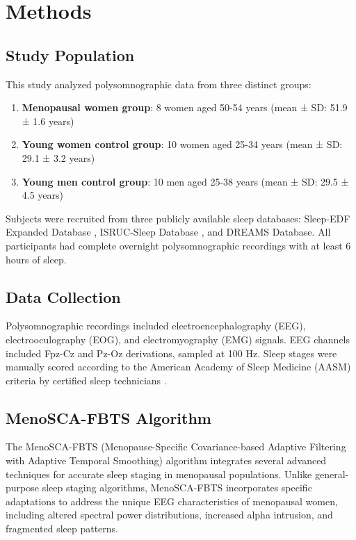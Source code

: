 \documentclass[a4paper,fleqn]{cas-dc}
\begin{document}
\section{Methods}\label{sec2}

\subsection{Study Population}

This study analyzed polysomnographic data from three distinct groups:

\begin{enumerate}
\item \textbf{Menopausal women group}: 8 women aged 50-54 years (mean ± SD: 51.9 ± 1.6 years)
\item \textbf{Young women control group}: 10 women aged 25-34 years (mean ± SD: 29.1 ± 3.2 years)
\item \textbf{Young men control group}: 10 men aged 25-38 years (mean ± SD: 29.5 ± 4.5 years)
\end{enumerate}

Subjects were recruited from three publicly available sleep databases: Sleep-EDF Expanded Database \cite{Goldberger2000}, ISRUC-Sleep Database \cite{Khalighi2016}, and DREAMS Database. All participants had complete overnight polysomnographic recordings with at least 6 hours of sleep.

\subsection{Data Collection}

Polysomnographic recordings included electroencephalography (EEG), electrooculography (EOG), and electromyography (EMG) signals. EEG channels included Fpz-Cz and Pz-Oz derivations, sampled at 100 Hz. Sleep stages were manually scored according to the American Academy of Sleep Medicine (AASM) criteria by certified sleep technicians \cite{Iber2007}.

\subsection{MenoSCA-FBTS Algorithm}

The MenoSCA-FBTS (Menopause-Specific Covariance-based Adaptive Filtering with Adaptive Temporal Smoothing) algorithm integrates several advanced techniques for accurate sleep staging in menopausal populations. Unlike general-purpose sleep staging algorithms, MenoSCA-FBTS incorporates specific adaptations to address the unique EEG characteristics of menopausal women, including altered spectral power distributions, increased alpha intrusion, and fragmented sleep patterns.
\end{document}
